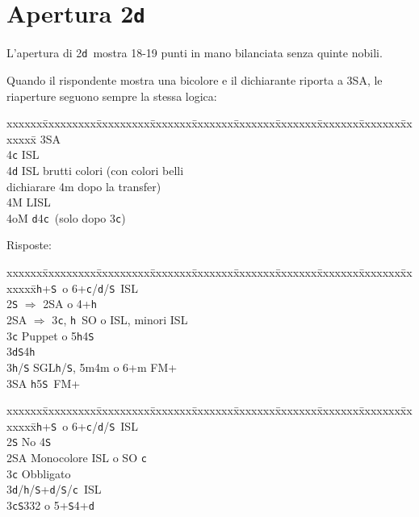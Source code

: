 \documentclass[a4paper,italian]{article}
\newcommand{\BS}{\small{\texttt{S}}}
\newcommand{\BC}{\small{\texttt{c}}}
\newcommand{\BD}{\small{\texttt{d}}}
\newcommand{\BH}{\small{\texttt{h}}}
\newcommand{\pdfd}{\texorpdfstring{\texttt{d}}{D}}
\newenvironment{bidtable}
{\begin{tabbing}

    xxxxxx\=xxxxxxxxx\=xxxxxxxxx\=xxxxxxx\=xxxxxxx\=xxxxxxx\=xxxxxxx\=xxxxxxx\=xxxxxxx\=xxxxxxx\=\kill}
{\end{tabbing} }%
\newenvironment{sviluppi}
{\begin{tcolorbox}[colframe=azzurro,title=Sviluppi particolari]}
    {
\end{tcolorbox} }%
\begin{document}
\newpage

\section{Apertura 2\pdfd}

\begin{multicols}{2}
    L'apertura di 2\BD\ mostra 18-19 punti in mano bilanciata senza quinte nobili.

    \begin{sviluppi}
        Quando il rispondente mostra una bicolore e il dichiarante riporta a 3\small{SA}, le riaperture seguono sempre la stessa logica:

        \begin{bidtable}\label{Riapertura3SA}
            3\small{SA}\+\\
            4\BC {} ISL\\
            4\BD {} ISL brutti colori (con colori belli\+\\ dichiarare 4m dopo la transfer)\-\\
            4M  LISL\\
            4oM \BD4\BC\ (solo dopo 3\BC)
        \end{bidtable}
    \end{sviluppi}
    Risposte:
    \begin{bidtable}
        2\BH {}+\BS\ o 6+\BC /\BD /\BS\ ISL\\
        2\BS \> $\Rightarrow$ 2\small{SA} o 4+\BH \\
        2\small{SA} \> $\Rightarrow$ 3\BC , \BH\ SO o ISL, minori ISL\\
        3\BC \> Puppet o 5\BH 4\BS \\
        3\BD {}\BS 4\BH \\
        3\BH/\BS \> SGL\BH /\BS , 5m4m o 6+m FM+\\
        3\small{SA} \BH 5\BS\ FM+
    \end{bidtable}
    \bigbreak
    \begin{bidtable}
        2\BH {}+\BS\ o 6+\BC /\BD /\BS\ ISL\+\\
        2\BS \> No 4\BS \+\\
        2\small{SA} \> Monocolore ISL o SO \BC \+\\
        3\BC \> Obbligato\+\\
        3\BD/\BH/\BS {}+\BD /\BS /\BC\ ISL\-\-\\
        3\BC {}\BS 332 o 5+\BS 4+\BD \+\\

\end{bidtable}
\end{multicols}
\end{document}
